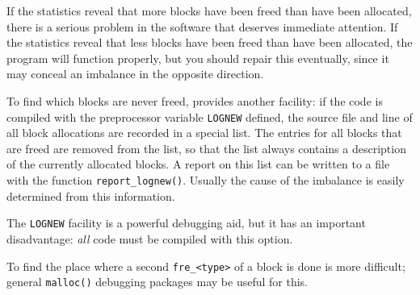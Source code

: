 \par
If the statistics reveal that more blocks have been freed than have
been allocated, there is a serious problem in the software that deserves
immediate attention.
If the statistics reveal that less blocks have been freed than have been
allocated,
the program will function properly, but you should repair this
eventually, since it may conceal an imbalance in the opposite direction.
\par
To find which blocks are never freed,
{\Tm} provides another facility:
if the code is compiled with the {\C} preprocessor variable
\texttt{LOGNEW} defined,
the source file and line of all {\Tm} block allocations are recorded in a
special list.
The entries for all blocks that are freed are removed from the list,
so that the list always contains a description of the currently allocated
blocks.
A report on this list can be written to a file with the function
\verb+report_lognew()+.
Usually the cause of the imbalance is easily determined from this information.
\par
The \texttt{LOGNEW} facility is a powerful debugging aid, but it has an important
disadvantage:
\emph{all} code must be compiled with this option.
\par
To find the place where a second \verb+fre_<type>+ of a block is done is
more difficult;
general \verb+malloc()+ debugging packages may be useful for this.
